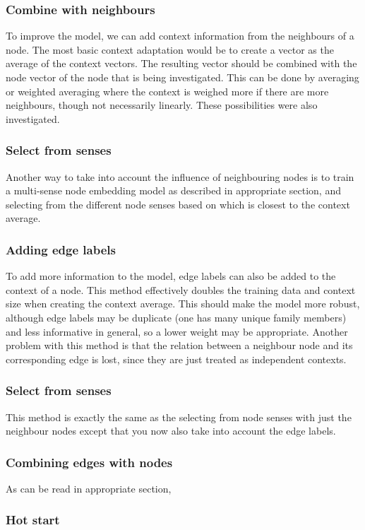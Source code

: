 \documentclass{article}
\begin{document}
  \subsubsection{Combine with neighbours}
  To improve the model, we can add context information from the neighbours of a node. The most basic context adaptation would be to create a vector as the average of the context vectors. The resulting vector should be combined with the node vector of the node that is being investigated. This can be done by averaging or weighted averaging where the context is weighed more if there are more neighbours, though not necessarily linearly. These possibilities were also investigated.
  \subsubsection{Select from senses}
  Another way to take into account the influence of neighbouring nodes is to train a multi-sense node embedding model as described in {appropriate section}, and selecting from the different node senses based on which is closest to the context average.
  \subsubsection{Adding edge labels}
  To add more information to the model, edge labels can also be added to the context of a node. This method effectively doubles the training data and context size when creating the context average. This should make the model more robust, although edge labels may be duplicate (one has many unique family members) and less informative in general, so a lower weight may be appropriate. Another problem with this method is that the relation between a neighbour node and its corresponding edge is lost, since they are just treated as independent contexts.
  \subsubsection{Select from senses}
  This method is exactly the same as the selecting from node senses with just the neighbour nodes except that you now also take into account the edge labels.
  \subsubsection{Combining edges with nodes}
  As can be read in {appropriate section}, 
  \subsubsection{Hot start}
\end{document}
